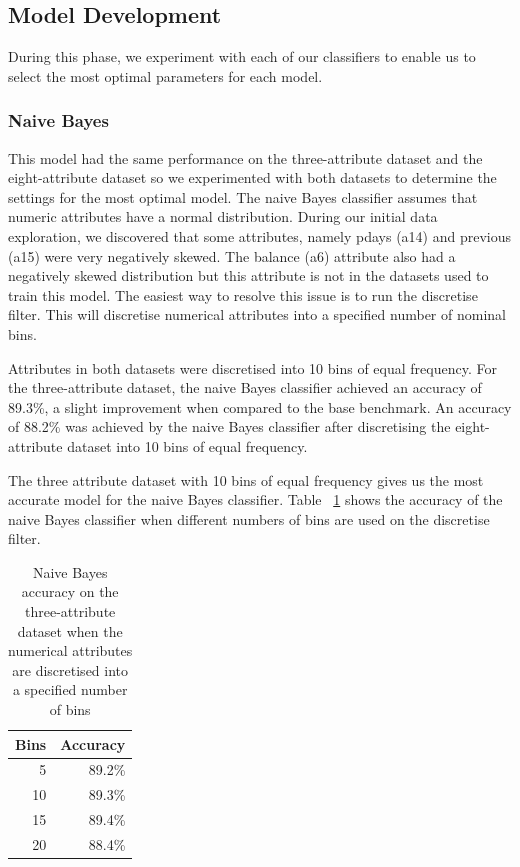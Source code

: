 \documentclass[a4paper,11pt]{article}
\begin{document}
\subsection{Model Development}

During this phase, we experiment with each of our classifiers to enable us to select the most optimal parameters
for each model.

\subsubsection{Naive Bayes}

This model had the same performance on the three-attribute dataset and the eight-attribute dataset so we experimented 
with both datasets to determine the settings for the most optimal model. The naive Bayes classifier
assumes that numeric attributes have a normal distribution. During our initial data exploration, we discovered
that some attributes, namely pdays (a14) and previous (a15) were very negatively skewed. The balance (a6) attribute
also had a negatively skewed distribution but this attribute is not in the datasets used to train this model. The
easiest way to resolve this issue is to run the discretise filter. This will discretise numerical attributes into
a specified number of nominal bins.

Attributes in both datasets were discretised into 10 bins of equal frequency. For the three-attribute
dataset, the naive Bayes classifier achieved an accuracy of 89.3\%, a slight improvement when compared to the base benchmark.
An accuracy of 88.2\% was achieved by the naive Bayes classifier after discretising the eight-attribute dataset into
10 bins of equal frequency.

The three attribute dataset with 10 bins of equal frequency gives us the most accurate model for the naive Bayes
classifier. Table ~\ref{tab:naiveBayesBins} shows the accuracy of the naive Bayes classifier when different numbers of
bins are used on the discretise filter. 

\begin{table}[H]
  \begin{center}
    \begin{tabular}{r | r}
      Bins & Accuracy  \\ \hline
      5 & 89.2\% \\
      10 & 89.3\% \\
      15 & 89.4\% \\
      20 & 88.4\% \\
    \end{tabular}
  \end{center}
  \caption{Naive Bayes accuracy on the three-attribute dataset when the numerical attributes are discretised
  into a specified number of bins}
  \label{tab:naiveBayesBins}
\end{table}
\end{document}
